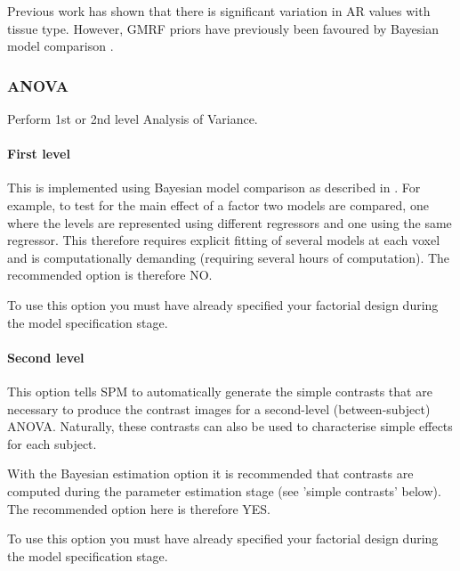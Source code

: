 Previous work has shown that there is significant variation in AR values with tissue type. However, GMRF priors have previously been favoured by Bayesian model comparison \cite{vb4}.


\subsubsection{ANOVA}
Perform 1st or 2nd level Analysis of Variance.


\paragraph{First level}
This is implemented using Bayesian model comparison as described in 
\cite{vb4}. For example, to test for the main effect of a factor two models are compared, one where the levels are represented using different regressors and one using the same regressor. This therefore requires explicit fitting of several models at each voxel and is computationally demanding (requiring several hours of computation). The recommended option is therefore NO.

                                                                                                            

To use this option you must have already specified your factorial design during the model specification stage. 


\paragraph{Second level}
This option tells SPM to automatically generate the simple contrasts that are necessary to produce the contrast images for a second-level (between-subject) ANOVA. Naturally, these contrasts can also be used to characterise simple effects for each subject. 

                                                                                                            

With the Bayesian estimation option it is recommended that contrasts are computed during the parameter estimation stage (see 'simple contrasts' below). The recommended option here is therefore YES.

                                                                                                            

To use this option you must have already specified your factorial design during the model specification stage. 

